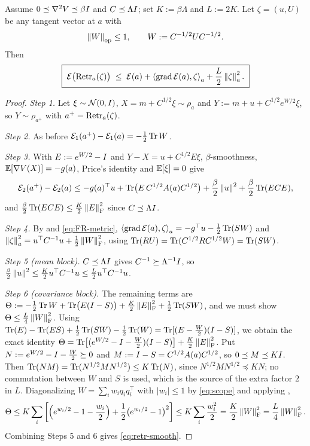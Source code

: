 \begin{lemma}
\label{lem:retr-smooth}
Assume $0\preceq\nabla^2V\preceq\beta I$ and $C\preceq\Lambda I$; set $K:=\beta\Lambda$ and
$L:=2K$. Let $\zeta=(u,U)$ be any tangent vector at $a$ with
\begin{equation}
\label{eq:scope}
    \left\lVert W\right\rVert_{\mathrm{op}}\leq1,\qquad W:=C^{-1/2}UC^{-1/2}.
\end{equation}
Then
\begin{equation}
\label{eq:retr-smooth}
    \boxed{\;
    \mathcal{E}\bigl(\operatorname{Retr}_a(\zeta)\bigr)
    \;\leq\;
    \mathcal{E}(a)+\left\langle \operatorname{grad}\mathcal{E}(a),\zeta\right\rangle_a+\frac L2\left\lVert \zeta\right\rVert_a^2 .
    \;}
\end{equation}
\end{lemma}

\begin{proof}
\emph{Step 1.} Let $\xi\sim\mathcal{N}(0,I)$, $X=m+C^{1/2}\xi\sim\rho_a$ and $Y:=m+u+C^{1/2}e^{W/2}\xi$,
so $Y\sim\rho_{a^+}$ with $a^+=\operatorname{Retr}_a(\zeta)$.

\emph{Step 2.} As before $\mathcal{E}_1(a^+)-\mathcal{E}_1(a)=-\tfrac12\operatorname{Tr} W$.

\emph{Step 3.} With $E:=e^{W/2}-I$ and $Y-X=u+C^{1/2}E\xi$, $\beta$-smoothness,
$\mathbb{E}[\nabla V(X)]=-g(a)$, Price's identity and $\mathbb{E}[\xi]=0$ give
\[
    \mathcal{E}_2(a^+)-\mathcal{E}_2(a)
    \leq-g(a)^\top u+\operatorname{Tr}\bigl(E\,C^{1/2}A(a)C^{1/2}\bigr)
    +\frac\beta2\left\lVert u\right\rVert^2+\frac\beta2\operatorname{Tr}(ECE),
\]
and $\tfrac\beta2\operatorname{Tr}(ECE)\leq\tfrac K2\left\lVert E\right\rVert_{\mathrm{F}}^2$ since $C\preceq\Lambda I$.

\emph{Step 4.} By  and \eqref{eq:FR-metric},
$\left\langle \operatorname{grad}\mathcal{E}(a),\zeta\right\rangle_a=-g^\top u-\tfrac12\operatorname{Tr}(SW)$ and
$\left\lVert \zeta\right\rVert_a^2=u^\top C^{-1}u+\tfrac12\left\lVert W\right\rVert_{\mathrm{F}}^2$, using
$\operatorname{Tr}(RU)=\operatorname{Tr}(C^{1/2}RC^{1/2}W)=\operatorname{Tr}(SW)$.

\emph{Step 5 (mean block).} $C\preceq\Lambda I$ gives $C^{-1}\succeq\Lambda^{-1}I$, so
$\tfrac\beta2\left\lVert u\right\rVert^2\leq\tfrac K2u^\top C^{-1}u\leq\tfrac L2u^\top C^{-1}u$.

\emph{Step 6 (covariance block).} The remaining terms are
$\Theta:=-\tfrac12\operatorname{Tr} W+\operatorname{Tr}\bigl(E(I-S)\bigr)+\tfrac K2\left\lVert E\right\rVert_{\mathrm{F}}^2+\tfrac12\operatorname{Tr}(SW)$, and
we must show $\Theta\leq\tfrac L4\left\lVert W\right\rVert_{\mathrm{F}}^2$. Using
$\operatorname{Tr}(E)-\operatorname{Tr}(ES)+\tfrac12\operatorname{Tr}(SW)-\tfrac12\operatorname{Tr}(W)=\operatorname{Tr}[(E-\tfrac W2)(I-S)]$, we obtain the exact
identity
$\Theta=\operatorname{Tr}\bigl[(e^{W/2}-I-\tfrac W2)(I-S)\bigr]+\tfrac K2\left\lVert E\right\rVert_{\mathrm{F}}^2$.
Put $N:=e^{W/2}-I-\tfrac W2\succeq0$ and $M:=I-S=C^{1/2}A(a)C^{1/2}$, so $0\preceq M\preceq KI$.
Then $\operatorname{Tr}(NM)=\operatorname{Tr}(N^{1/2}MN^{1/2})\leq K\operatorname{Tr}(N)$, since $N^{1/2}MN^{1/2}\preceq KN$; no commutation
between $W$ and $S$ is used, which is the source of the extra factor $2$ in $L$. Diagonalizing
$W=\sum_iw_iq_iq_i^\top$ with $|w_i|\leq1$ by \eqref{eq:scope} and applying ,
\[
    \Theta\leq K\sum_i\left[\Bigl(e^{w_i/2}-1-\frac{w_i}2\Bigr)+\frac12\bigl(e^{w_i/2}-1\bigr)^2\right]
    \leq K\sum_i\frac{w_i^2}2=\frac K2\left\lVert W\right\rVert_{\mathrm{F}}^2=\frac L4\left\lVert W\right\rVert_{\mathrm{F}}^2 .
\]
Combining Steps 5 and 6 gives \eqref{eq:retr-smooth}.
\end{proof}


